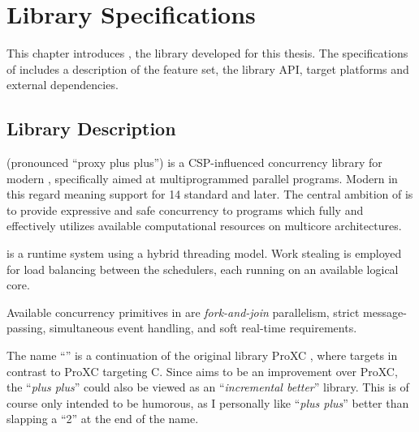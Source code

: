 
\chapter{Library Specifications}
\label{ch:library_specifications}


This chapter introduces \Proxc{}, the library developed for this thesis. The specifications of \Proxc{} includes a description of the feature set, the library API, target platforms and external dependencies. 


\section{Library Description}
\label{sec:library_overview}


\Proxc{} (pronounced ``proxy plus plus'') is a CSP\hyp{}influenced concurrency library for modern \Cpp{}, specifically aimed at multiprogrammed parallel programs. Modern \Cpp{} in this regard meaning support for \Cpp{}14 standard and later. The central ambition of \Proxc{} is to provide expressive and safe concurrency to \Cpp{} programs which fully and effectively utilizes available computational resources on multicore architectures.

\Proxc{} is a runtime system using a hybrid threading model. Work stealing is employed for load balancing between the schedulers, each running on an available logical core. 

Available concurrency primitives in \Proxc{} are \textit{fork\hyp{}and\hyp{}join} parallelism, strict message\hyp{}passing, simultaneous event handling, and soft real\hyp{}time requirements.

The name ``\Proxc{}'' is a continuation of the original library ProXC \citep{pettersen2016proxc}, where \Proxc{} targets \Cpp{} in contrast to ProXC targeting C. Since \Proxc{} aims to be an improvement over ProXC, the ``\textit{plus plus}'' could also be viewed as an ``\textit{incremental better}'' library. This is of course only intended to be humorous, as I personally like ``\textit{plus plus}'' better than slapping a ``2'' at the end of the name.


